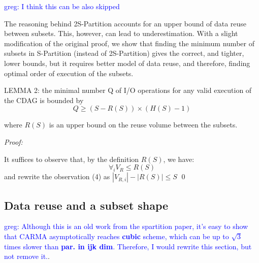 \documentclass[sigconf]{acmart}
\newcommand\greg[1]{\textcolor{blue}{greg: #1}}
\begin{document}
\greg{I think this can be also skipped}

The reasoning behind 2S-Partition accounts for an upper bound of data 
reuse 
between subsets.
This, however, can lead to underestimation. With a slight modification of 
the original proof, we show that finding the minimum number of subsets in 
S-Partition 
(instead of 
2S-Partition) gives the correct, and tighter, lower bounds, but it 
requires better model of data reuse, and therefore, finding optimal order 
of execution of the subsets.

LEMMA 2:
the minimal number Q of I/O operations for any valid execution of the CDAG 
is bounded by	
\begin{equation}
Q \ge (S - R(S)) \times (H(S) - 1)
	\label{eq:reusebound}
\end{equation}

where $R(S)$ is an upper bound on the reuse volume between the subsets.

\textit{Proof:}

It suffices to observe that, by the definition $R(S)$, we have:
$$\forall_{i} V_{R} \le R(S)$$
and rewrite the observation (4) as $|V_{R,i}| - |R(S)| \le S$ \qed


%	
%	
\subsection{Data reuse and a subset shape}
\label{sec:partitionShape}

\greg{Although this is an old work from the spartition paper, it's easy to show 
that CARMA asymptotically reaches \textbf{cubic} scheme, which can be up to 
$\sqrt{3}$ times slower than \textbf{par. in ijk dim}. Therefore, I would 
rewrite 
this section, but not remove it.}.
\end{document}

